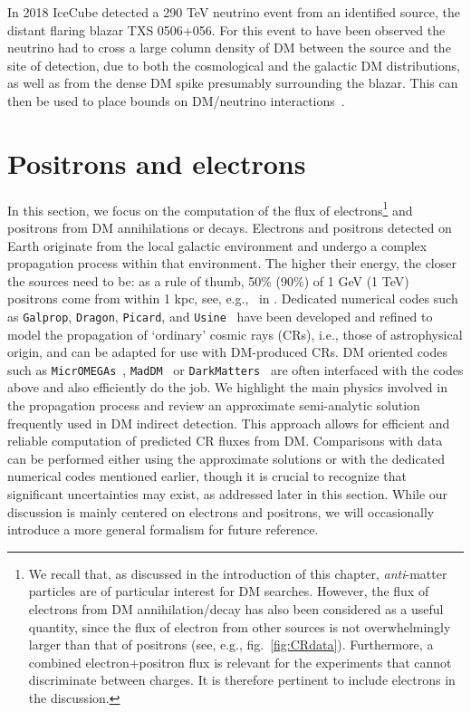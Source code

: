 In 2018 {\sc IceCube} detected a 290 TeV neutrino event from an identified source, the distant flaring blazar TXS 0506+056. For this event to have been observed the neutrino had to cross a large column density of DM between the source and the site of detection, due to both the cosmological and the galactic DM distributions, as well as from the dense DM  spike presumably surrounding the blazar. This can then be used to place bounds on  DM/neutrino interactions~\cite{DM:nu:interactions}.



\section{Positrons and electrons}\label{sec:e+e-}
In this section, we focus on the computation of the flux of electrons\footnote{We recall that, as discussed in the introduction of this chapter, {\em anti}-matter particles are of particular interest for DM searches. However, the flux of electrons  from DM annihilation/decay has also been considered as a useful quantity, since the flux of electron from other sources is not overwhelmingly larger than that of positrons (see, e.g., fig.~\ref{fig:CRdata}).  Furthermore, a combined electron$+$positron flux is relevant for the experiments that cannot discriminate between charges. It is therefore pertinent to include electrons in the discussion.}
 and positrons from DM annihilations or decays. 
Electrons and positrons detected on Earth originate from the local galactic environment and undergo a complex propagation process within that environment. 
The higher their energy, the closer the sources need to be: 
as a rule of thumb, 50\% (90\%) of 1 GeV (1 TeV) positrons come from within 1 kpc, 
see, e.g.,~ in \cite{CRpropagation}.
Dedicated numerical codes such as {\tt Galprop}, {\tt Dragon}, {\tt Picard}, and {\tt Usine}~\cite{CRcodes} have been developed and refined to model the propagation of `ordinary' cosmic rays (CRs), i.e., those of astrophysical origin, and can be adapted for use with DM-produced CRs.
DM oriented codes such as {\tt MicrOMEGAs}~\cite{1801.03509}, {\tt MadDM}~\cite{1804.00044} or {\tt DarkMatters}~\cite{2408.07053} are often interfaced with the codes above and also efficiently do the job.
We highlight the main physics involved in the propagation process and review an approximate semi-analytic solution frequently used in DM indirect detection.
This approach allows for efficient and reliable computation of predicted CR fluxes from DM. 
Comparisons with data can be performed either using the approximate solutions or with the dedicated numerical codes mentioned earlier, though it is crucial to recognize that significant uncertainties may exist, as addressed later in this section.
 While our discussion is mainly centered on electrons and positrons, we will occasionally introduce a more general formalism for future reference.

